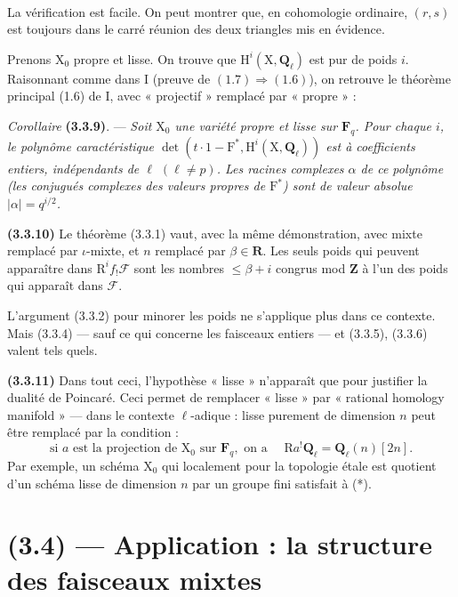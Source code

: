 \documentclass[11pt,leqno]{article}
\newcommand{\Page}[1]{\ifvmode\noindent\else\unskip\ \fi{\footnotesize\textcolor{gray}{[p.\,#1]}}\ \ignorespaces}
\begin{document}
\Page{207}

La vérification est facile. On peut montrer que, en cohomologie ordinaire, \((r,s)\) est toujours dans le carré réunion des deux triangles mis en évidence.

Prenons \(\mathrm{X}_0\) propre et lisse. On trouve que \(\mathrm{H}^i(\mathrm{X},\mathbf{Q}_\ell)\) est pur de poids \(i\). Raisonnant comme dans I (preuve de \((1.7)\Rightarrow(1.6)\)), on retrouve le théorème principal (1.6) de I, avec « projectif » remplacé par « propre » :

\textit{Corollaire} \textbf{(3.3.9)}. — \textit{Soit \(\mathrm{X}_0\) une variété propre et lisse sur \(\mathbf{F}_q\). Pour chaque \(i\), le polynôme caractéristique \(\det(t\cdot1-\mathrm{F}^*,\mathrm{H}^i(\mathrm{X},\mathbf{Q}_\ell))\) est à coefficients entiers, indépendants de \(\ell\) \((\ell\neq p)\). Les racines complexes \(\alpha\) de ce polynôme (les conjugués complexes des valeurs propres de \(\mathrm{F}^*\)) sont de valeur absolue \(|\alpha|=q^{i/2}\).}

\textbf{(3.3.10)} Le théorème (3.3.1) vaut, avec la même démonstration, avec mixte remplacé par \(\iota\)-mixte, et \(n\) remplacé par \(\beta\in\mathbf{R}\). Les seuls poids qui peuvent apparaître dans \(\mathrm{R}^if_!\mathscr{F}\) sont les nombres \(\leq\beta+i\) congrus mod \(\mathbf{Z}\) à l’un des poids qui apparaît dans \(\mathscr{F}\).

L’argument (3.3.2) pour minorer les poids ne s’applique plus dans ce contexte. Mais (3.3.4) — sauf ce qui concerne les faisceaux entiers — et (3.3.5), (3.3.6) valent tels quels.

\textbf{(3.3.11)} Dans tout ceci, l’hypothèse « lisse » n’apparaît que pour justifier la dualité de Poincaré. Ceci permet de remplacer « lisse » par « rational homology manifold » — dans le contexte \(\ell\)-adique : lisse purement de dimension \(n\) peut être remplacé par la condition :
\[
\text{si }a\text{ est la projection de }\mathrm{X}_0
\text{ sur }\mathbf{F}_q,\text{ on a }\quad
\mathrm{R}a^!\mathbf{Q}_\ell=\mathbf{Q}_\ell(n)[2n].
\tag*{(*)}
\]
Par exemple, un schéma \(\mathrm{X}_0\) qui localement pour la topologie étale est quotient d’un schéma lisse de dimension \(n\) par un groupe fini satisfait à (*).

\section*{(3.4) — Application : la structure des faisceaux mixtes}
\end{document}
